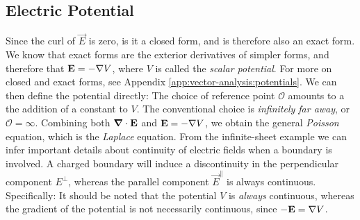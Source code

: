 \subsection{Electric Potential}	
Since the curl of $\vec{E}$ is zero, is it a closed form, and is therefore also an exact form. We know that exact forms are the exterior derivatives of simpler forms, and therefore that $\boldsymbol{\mathbf{E}} = -\nabla V$, where $V$ is called the \textit{scalar potential}. For more on closed and exact forms, see Appendix \ref{app:vector-analysis:potentials}. 
We can then define the potential directly:
The choice of reference point $\mathcal{O}$ amounts to a the addition of a constant to $V$. The conventional choice is \textit{infinitely far away}, or $\mathcal{O}=\infty$. Combining both $\boldsymbol{\mathbf{\nabla}}\cdot \boldsymbol{\mathbf{E}}$ and $\boldsymbol{\mathbf{E}}=-\nabla V$, we obtain the general \textit{Poisson} equation, which is the \textit{Laplace} equation.
From the infinite-sheet example we can infer important details about continuity of electric fields when a boundary is involved. A charged boundary will induce a discontinuity in the perpendicular component $E^{\perp}$, whereas the parallel component $\vec{E}^{\parallel}$ is always continuous. Specifically:
It should be noted that the potential $V$ is \textit{always} continuous, whereas the gradient of the potential is not necessarily continuous, since $-\boldsymbol{\mathbf{E}} = \nabla V$.
